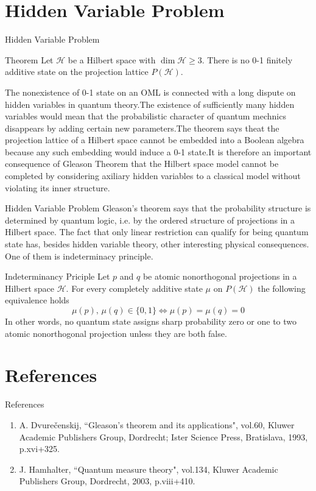 \documentclass{beamer}
\begin{document}
\section{Hidden Variable Problem}
\begin{frame}{Hidden Variable Problem}
    \begin{block}{Theorem} Let \(\mathcal{H}\) be a Hilbert space with \(\dim \mathcal{H}\ge 3\). There is no 0-1 finitely additive state on the projection lattice \(P(\mathcal{H})\).
    \end{block}\pause
    The nonexistence of 0-1 state on an OML is connected with a long dispute on hidden variables in quantum theory.\pause The existence of sufficiently many hidden variables would mean that the probabilistic character of quantum mechnics disappears by adding certain new parameters.\pause The theorem says theat the projection lattice of a Hilbert space cannot be embedded into a Boolean algebra because any such embedding would induce a 0-1 state.\pause It is therefore an important consequence of Gleason Theorem that the Hilbert space model cannot be completed by considering axiliary hidden variables to a classical model without violating its inner structure.

   
\end{frame}
\begin{frame}{Hidden Variable Problem}
 Gleason's theorem says that the probability structure is determined by quantum logic, i.e. by the ordered structure of projections in a Hilbert space. The fact that only linear restriction can qualify for being quantum state has, besides hidden variable theory, other interesting physical consequences. One of them is indeterminacy principle.
 \begin{block}{Indeterminancy Priciple}
    Let \(p\) and \(q\) be atomic nonorthogonal projections in a Hilbert space \(\mathcal{H}\). For every completely additive state \(\mu\) on \(P(\mathcal{H})\) the following equivalence holds
    \[\mu(p),\,\mu(q) \in \{0,1\} \Leftrightarrow \mu(p)=\mu(q)=0\]
    In other words, no quantum state assigns sharp probability zero or one to two atomic nonorthogonal projection unless they are both false.
 \end{block}   
    
\end{frame}

\section{References}
\begin{frame}{References}
\begin{enumerate}
    \item A. Dvurečenskij, ``Gleason's theorem and its applications", vol.60, Kluwer Academic Publishers Group, Dordrecht; Ister Science Press, Bratislava, 1993, p.xvi+325.
    \item J. Hamhalter, ``Quantum measure theory", vol.134, Kluwer Academic Publishers Group, Dordrecht, 2003, p.viii+410.
\end{enumerate}
\end{frame}
\end{document}
